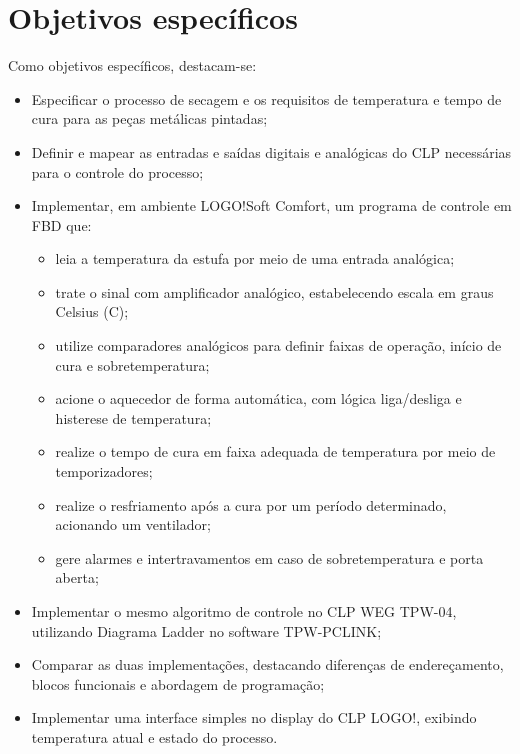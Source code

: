 \documentclass[
  12pt,
  openright,
  oneside,
  a4paper,
  chapter=TITLE,
  section=TITLE,
  brazilian
]{abntex2}
\begin{document}
\section{Objetivos espec\'{i}ficos}

Como objetivos espec\'{i}ficos, destacam-se:
\begin{itemize}
    \item Especificar o processo de secagem e os requisitos de temperatura e tempo de cura para as pe\c{c}as met\'{a}licas pintadas;
    \item Definir e mapear as entradas e sa\'{i}das digitais e anal\'{o}gicas do CLP necess\'{a}rias para o controle do processo;
    \item Implementar, em ambiente LOGO!Soft Comfort, um programa de controle em FBD que:
    \begin{itemize}
        \item leia a temperatura da estufa por meio de uma entrada anal\'{o}gica;
        \item trate o sinal com amplificador anal\'{o}gico, estabelecendo escala em graus Celsius (\textdegree{}C);
        \item utilize comparadores anal\'{o}gicos para definir faixas de opera\c{c}\~{a}o, in\'{i}cio de cura e sobretemperatura;
        \item acione o aquecedor de forma autom\'{a}tica, com l\'{o}gica liga/desliga e histerese de temperatura;
        \item realize o tempo de cura em faixa adequada de temperatura por meio de temporizadores;
        \item realize o resfriamento ap\'{o}s a cura por um per\'{i}odo determinado, acionando um ventilador;
        \item gere alarmes e intertravamentos em caso de sobretemperatura e porta aberta;
    \end{itemize}
    \item Implementar o mesmo algoritmo de controle no CLP WEG TPW-04, utilizando Diagrama Ladder no software TPW-PCLINK;
    \item Comparar as duas implementa\c{c}\~{o}es, destacando diferen\c{c}as de endere\c{c}amento, blocos funcionais e abordagem de programa\c{c}\~{a}o;
    \item Implementar uma interface simples no display do CLP LOGO!, exibindo temperatura atual e estado do processo.
\end{itemize}

\end{document}
